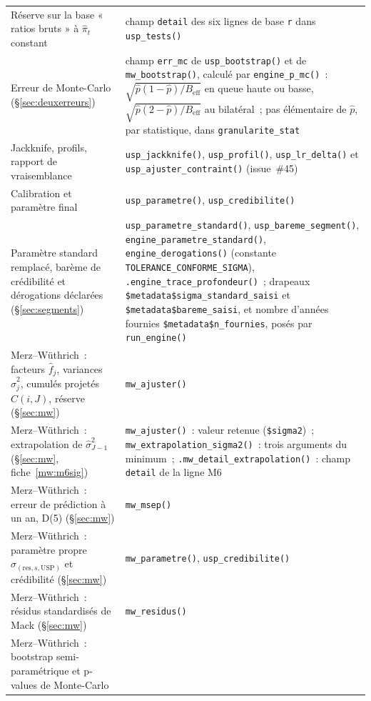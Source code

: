 \documentclass[a4paper,11pt]{article}
\newcommand{\code}[1]{\texttt{\small #1}}
\begin{document}
{\begin{longtable}{@{}p{5.6cm}p{9.4cm}@{}}
Réserve sur la base « ratios bruts » à $\hat\pi_t$ constant & champ \code{detail} des six lignes
de base \code{r} dans \code{usp\_tests()} \\
Erreur de Monte-Carlo (§\ref{sec:deuxerreurs}) & champ \code{err\_mc} de \code{usp\_bootstrap()} et de
\code{mw\_bootstrap()}, calculé par \code{engine\_p\_mc()}~: $\sqrt{\hat p(1-\hat p)/B_{\text{eff}}}$
en queue haute ou basse, $\sqrt{\hat p(2-\hat p)/B_{\text{eff}}}$ au bilatéral~; pas élémentaire
de $\hat p$, par statistique, dans \code{granularite\_stat} \\
Jackknife, profils, rapport de vraisemblance & \code{usp\_jackknife()}, \code{usp\_profil()},
\code{usp\_lr\_delta()} et \code{usp\_ajuster\_contraint()} (issue~\#45) \\
Calibration et paramètre final & \code{usp\_parametre()}, \code{usp\_credibilite()} \\
Paramètre standard remplacé, barème de crédibilité et dérogations déclarées
(§\ref{sec:segments}) & \code{usp\_parametre\_standard()}, \code{usp\_bareme\_segment()},
\code{engine\_parametre\_standard()}, \code{engine\_derogations()} (constante
\code{TOLERANCE\_CONFORME\_SIGMA}), \code{.engine\_trace\_profondeur()}~; drapeaux
\code{\$metadata\$sigma\_standard\_saisi} et \code{\$metadata\$bareme\_saisi}, et nombre d'années
fournies \code{\$metadata\$n\_fournies}, posés par \code{run\_engine()} \\
Merz--Wüthrich~: facteurs $\hat f_j$, variances $\hat\sigma_j^2$, cumulés
projetés $\hat C(i,J)$, réserve (§\ref{sec:mw}) & \code{mw\_ajuster()} \\
Merz--Wüthrich~: extrapolation de $\hat\sigma^2_{J-1}$ (§\ref{sec:mw},
fiche~\ref{mw:m6sig}) & \code{mw\_ajuster()}~: valeur retenue (\code{\$sigma2})~;\newline
\code{mw\_extrapolation\_sigma2()}~: trois arguments du minimum~;\newline
\code{.mw\_detail\_extrapolation()}~: champ \code{detail} de la ligne M6 \\
Merz--Wüthrich~: erreur de prédiction à un an, D(5) (§\ref{sec:mw}) &
\code{mw\_msep()} \\
Merz--Wüthrich~: paramètre propre $\sigma_{(\text{res},s,\mathrm{USP})}$ et
crédibilité (§\ref{sec:mw}) & \code{mw\_parametre()}, \code{usp\_credibilite()} \\
Merz--Wüthrich~: résidus standardisés de Mack (§\ref{sec:mw}) &
\code{mw\_residus()} \\
Merz--Wüthrich~: bootstrap semi-paramétrique et p-values de Monte-Carlo

\end{longtable}}
\end{document}
